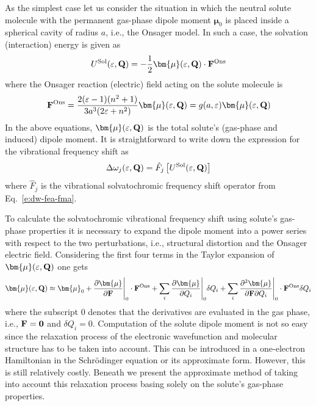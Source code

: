 \documentclass[a4paper,titlepage,twoside,fleqn,12pt]{book}
\newcommand{\BM}[1]{\bm{#1}}
\newcommand{\fderiv}[2]{\ensuremath{
    \frac{\partial #1}{\partial #2}}}
\newcommand{\sderivd}[3]{\ensuremath{
    \frac{\partial^2 #1}{\partial #2 \partial #3}
    }}
\begin{document}
\begin{refsection}
As the simplest case let us consider the situation
in which the neutral solute molecule with the permanent gas\hyp{}phase 
dipole moment ${\BM \mu}_0$
is placed inside a spherical cavity of radius $a$, i.e., the 
Onsager model. 
In such a case, the solvation (interaction) energy is given as
%
\begin{equation} \label{e:esol-onsager}
 U^{\rm Sol}(\varepsilon, {\bf Q}) =
 -\frac{1}{2} {\BM \mu}(\varepsilon, {\bf Q}) \cdot {\bf F}^{\rm Ons}
\end{equation}
%
where the Onsager reaction (electric) field acting on the solute molecule
is
%
\begin{equation} \label{e:fons}
  {\bf F}^{\rm Ons} = \frac{2(\varepsilon-1)(n^2+1)}{3a^3(2\varepsilon+n^2)} {\BM \mu}(\varepsilon, {\bf Q})
 = g(a,\varepsilon) {\BM \mu}(\varepsilon, {\bf Q})
\end{equation}
%
In the above equations, ${\BM \mu}(\varepsilon, {\bf Q})$ 
is the total solute's (gas\hyp{}phase and induced) dipole moment.
It is straightforward to write down the expression for the
vibrational frequency shift as
%
\begin{equation} \label{e:dw-ons-gen}
  \Delta\omega_j(\varepsilon, {\bf Q}) = \hat{F}_j \left[ U^{\rm Sol}(\varepsilon, {\bf Q}) \right]
\end{equation}
%
where $\hat{F}_j$ is the vibrational solvatochromic frequency shift 
operator from Eq.~\eqref{e:dw-fea-fma}.

To calculate the solvatochromic vibrational frequency shift
using solute's gas\hyp{}phase properties it is necessary to expand
the dipole moment into a power series with respect to the two perturbations,
i.e., structural distortion and the Onsager electric field. Considering the first
four terms in the Taylor expansion of ${\BM \mu}(\varepsilon, {\bf Q})$ one gets
%
\begin{equation} \label{e:mu-qf}
 {\BM \mu}(\varepsilon, {\bf Q}) \approx 
 {\BM \mu}_0 + \fderiv{{\BM \mu}}{\bf F}\Bigg|_{0}  \cdot {\bf F}^{\rm Ons}
 + \sum_i \fderiv{{\BM \mu}}{Q_i}\Bigg|_{0} \delta Q_i 
 + \sum_i \sderivd{{\BM \mu}}{{\bf F}}{Q_i}\Bigg|_{0} \cdot {\bf F}^{\rm Ons} \delta Q_i
\end{equation}
%
where the subscript $0$ denotes that the derivatives are evaluated in the gas phase,
i.e., ${\bf F}={\bf 0}$ and $\delta Q_i=0$. Computation of the solute dipole
moment is not so easy since the relaxation process of the electronic wavefunction
and molecular structure has to be taken into account. This can 
be introduced in a one\hyp{}electron Hamiltonian in the Schr{\"o}dinger equation
or its approximate form. However, this is still relatively costly. Beneath
we present the approximate method of taking into account
this relaxation process basing solely on the solute's gas\hyp{}phase properties.


\end{refsection}
\end{document}
